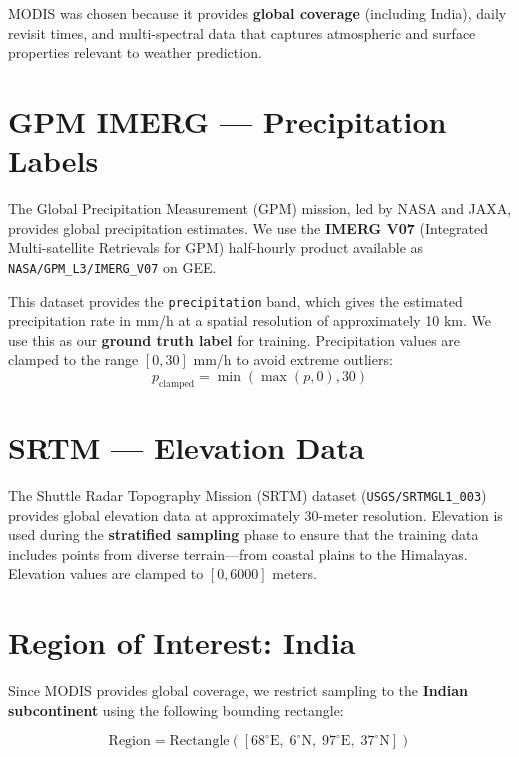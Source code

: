 \documentclass[12pt, a4paper]{report}
\begin{document}
MODIS was chosen because it provides \textbf{global coverage} (including India), daily revisit times, and multi-spectral data that captures atmospheric and surface properties relevant to weather prediction.

\section{GPM IMERG --- Precipitation Labels}

The Global Precipitation Measurement (GPM) mission, led by NASA and JAXA, provides global precipitation estimates. We use the \textbf{IMERG V07} (Integrated Multi-satellite Retrievals for GPM) half-hourly product available as \texttt{NASA/GPM\_L3/IMERG\_V07} on GEE.

This dataset provides the \texttt{precipitation} band, which gives the estimated precipitation rate in mm/h at a spatial resolution of approximately 10 km. We use this as our \textbf{ground truth label} for training. Precipitation values are clamped to the range $[0, 30]$ mm/h to avoid extreme outliers:
\begin{equation}
    p_{\text{clamped}} = \min(\max(p, 0), 30)
    \label{eq:precip_clamp}
\end{equation}

\section{SRTM --- Elevation Data}

The Shuttle Radar Topography Mission (SRTM) dataset (\texttt{USGS/SRTMGL1\_003}) provides global elevation data at approximately 30-meter resolution. Elevation is used during the \textbf{stratified sampling} phase to ensure that the training data includes points from diverse terrain---from coastal plains to the Himalayas. Elevation values are clamped to $[0, 6000]$ meters.

\section{Region of Interest: India}

Since MODIS provides global coverage, we restrict sampling to the \textbf{Indian subcontinent} using the following bounding rectangle:

\begin{equation}
    \text{Region} = \text{Rectangle}([68^\circ\text{E},\; 6^\circ\text{N},\; 97^\circ\text{E},\; 37^\circ\text{N}])
    \label{eq:region}
\end{equation}
\end{document}
